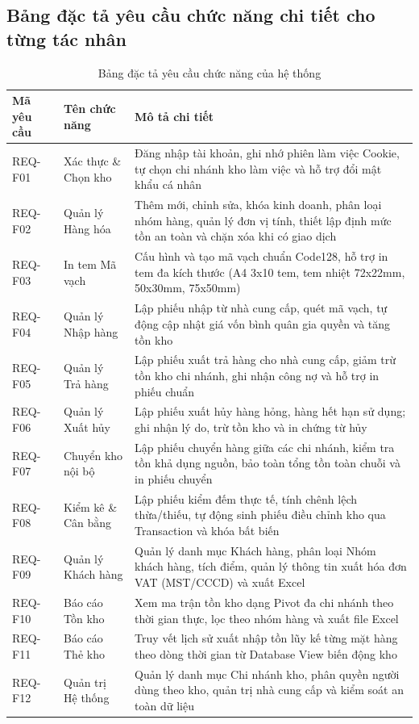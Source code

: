 \documentclass[12pt,a4paper]{report}
\renewcommand{\_}{\textunderscore\allowbreak}
\begin{document}
\subsection{Bảng đặc tả yêu cầu chức năng chi tiết cho từng tác nhân}
\begin{table}[H]
\centering
\small
\renewcommand{\arraystretch}{1.25}
\begin{tabularx}{\textwidth}{|p{2.6cm}|p{3.8cm}|Y|}
\hline
{}
Mã yêu cầu & Tên chức năng & Mô tả chi tiết \\
\hline
REQ-F01 & Xác thực \& Chọn kho & Đăng nhập tài khoản, ghi nhớ phiên làm việc Cookie, tự chọn chi nhánh kho làm việc và hỗ trợ đổi mật khẩu cá nhân \\
\hline
REQ-F02 & Quản lý Hàng hóa & Thêm mới, chỉnh sửa, khóa kinh doanh, phân loại nhóm hàng, quản lý đơn vị tính, thiết lập định mức tồn an toàn và chặn xóa khi có giao dịch \\
\hline
REQ-F03 & In tem Mã vạch & Cấu hình và tạo mã vạch chuẩn Code128, hỗ trợ in tem đa kích thước (A4 3x10 tem, tem nhiệt 72x22mm, 50x30mm, 75x50mm) \\
\hline
REQ-F04 & Quản lý Nhập hàng & Lập phiếu nhập từ nhà cung cấp, quét mã vạch, tự động cập nhật giá vốn bình quân gia quyền và tăng tồn kho \\
\hline
REQ-F05 & Quản lý Trả hàng & Lập phiếu xuất trả hàng cho nhà cung cấp, giảm trừ tồn kho chi nhánh, ghi nhận công nợ và hỗ trợ in phiếu chuẩn \\
\hline
REQ-F06 & Quản lý Xuất hủy & Lập phiếu xuất hủy hàng hỏng, hàng hết hạn sử dụng; ghi nhận lý do, trừ tồn kho và in chứng từ hủy \\
\hline
REQ-F07 & Chuyển kho nội bộ & Lập phiếu chuyển hàng giữa các chi nhánh, kiểm tra tồn khả dụng nguồn, bảo toàn tổng tồn toàn chuỗi và in phiếu chuyển \\
\hline
REQ-F08 & Kiểm kê \& Cân bằng & Lập phiếu kiểm đếm thực tế, tính chênh lệch thừa/thiếu, tự động sinh phiếu điều chỉnh kho qua Transaction và khóa bất biến \\
\hline
REQ-F09 & Quản lý Khách hàng & Quản lý danh mục Khách hàng, phân loại Nhóm khách hàng, tích điểm, quản lý thông tin xuất hóa đơn VAT (MST/CCCD) và xuất Excel \\
\hline
REQ-F10 & Báo cáo Tồn kho & Xem ma trận tồn kho dạng Pivot đa chi nhánh theo thời gian thực, lọc theo nhóm hàng và xuất file Excel \\
\hline
REQ-F11 & Báo cáo Thẻ kho & Truy vết lịch sử xuất nhập tồn lũy kế từng mặt hàng theo dòng thời gian từ Database View biến động kho \\
\hline
REQ-F12 & Quản trị Hệ thống & Quản lý danh mục Chi nhánh kho, phân quyền người dùng theo kho, quản trị nhà cung cấp và kiểm soát an toàn dữ liệu \\
\hline
\end{tabularx}
\caption{Bảng đặc tả yêu cầu chức năng của hệ thống}
\label{tab:dac_ta_chuc_nang}
\end{table}
\end{document}
